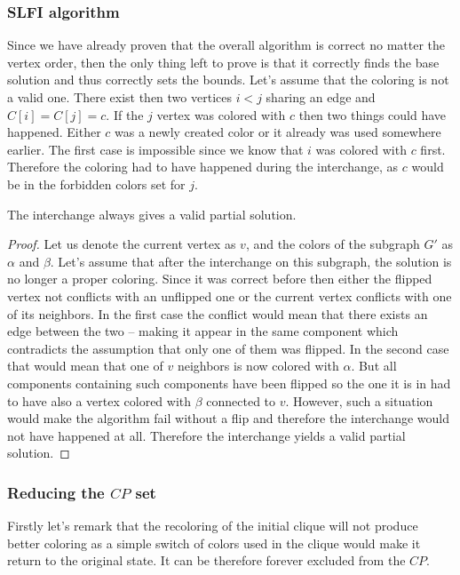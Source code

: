 \subsubsection{SLFI algorithm}
Since we have already proven that the overall algorithm is correct no matter the vertex order, then the only thing left to prove is that it correctly finds the base solution and thus correctly sets the bounds.
Let's assume that the coloring is not a valid one. There exist then two vertices $i < j$ sharing an edge and $C[i] = C[j] = c$. If the $j$ vertex was colored with $c$ then two things could have happened. Either $c$ was a newly created color or it already was used somewhere earlier. The first case is impossible since we know that $i$ was colored with $c$ first. Therefore the coloring had to have happened during the interchange, as $c$ would be in the forbidden colors set for $j$.

\begin{theorem}
    The interchange always gives a valid partial solution.
\end{theorem}
\begin{proof}
    Let us denote the current vertex as $v$, and the colors of the subgraph $G'$ as $\alpha$ and $\beta$. Let's assume that after the interchange on this subgraph, the solution is no longer a proper coloring. Since it was correct before then either the flipped vertex not conflicts with an unflipped one or the current vertex conflicts with one of its neighbors. In the first case the conflict would mean that there exists an edge between the two -- making it appear in the same component which contradicts the assumption that only one of them was flipped. In the second case that would mean that one of $v$ neighbors is now colored with $\alpha$. But all components containing such components have been flipped so the one it is in had to have also a vertex colored with $\beta$ connected to $v$. However, such a situation would make the algorithm fail without a flip and therefore the interchange would not have happened at all. Therefore the interchange yields a valid partial solution.
\end{proof}

\subsubsection{Reducing the $CP$ set}
Firstly let's remark that the recoloring of the initial clique will not produce better coloring as a simple switch of colors used in the clique would make it return to the original state. It can be therefore forever excluded from the $CP$.

